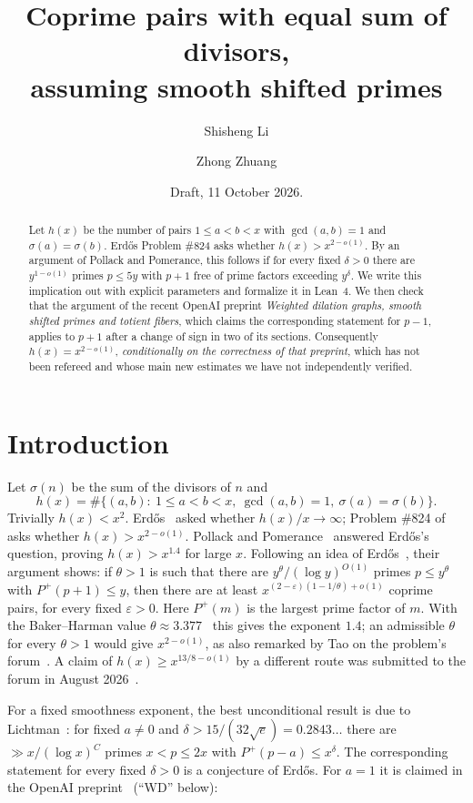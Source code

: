 \documentclass[11pt]{amsart}
\title[Coprime pairs with equal sum of divisors]{Coprime pairs with equal sum of divisors,\\ assuming smooth shifted primes}
\author{Shisheng Li}
\author{Zhong Zhuang}
\date{Draft, 11 October 2026.}
\theoremstyle{definition}
\theoremstyle{remark}
\newcommand{\eps}{\varepsilon}
\newcommand{\Pplus}{P^{+}}
\begin{document}
\sloppy
\begin{abstract}
Let $h(x)$ be the number of pairs $1\le a<b<x$ with $\gcd(a,b)=1$ and $\sigma(a)=\sigma(b)$. Erd\H{o}s Problem \#824 asks whether $h(x)>x^{2-o(1)}$. By an argument of Pollack and Pomerance, this follows if for every fixed $\delta>0$ there are $y^{1-o(1)}$ primes $p\le5y$ with $p+1$ free of prime factors exceeding $y^\delta$. We write this implication out with explicit parameters and formalize it in Lean~4. We then check that the argument of the recent OpenAI preprint \emph{Weighted dilation graphs, smooth shifted primes and totient fibers}, which claims the corresponding statement for $p-1$, applies to $p+1$ after a change of sign in two of its sections. Consequently $h(x)=x^{2-o(1)}$, \emph{conditionally on the correctness of that preprint}, which has not been refereed and whose main new estimates we have not independently verified.
\end{abstract}

\maketitle

\section{Introduction}

Let $\sigma(n)$ be the sum of the divisors of $n$ and
\[
 h(x)=\#\{(a,b):\ 1\le a<b<x,\ \gcd(a,b)=1,\ \sigma(a)=\sigma(b)\}.
\]
Trivially $h(x)<x^2$. Erd\H{o}s~\cite{Er59} asked whether $h(x)/x\to\infty$; Problem \#824 of~\cite{EP} asks whether $h(x)>x^{2-o(1)}$. Pollack and Pomerance~\cite[\S6]{PP16} answered Erd\H{o}s's question, proving $h(x)>x^{1.4}$ for large $x$. Following an idea of Erd\H{o}s~\cite{Er35}, their argument shows: if $\theta>1$ is such that there are $y^\theta/(\log y)^{O(1)}$ primes $p\le y^\theta$ with $\Pplus(p+1)\le y$, then there are at least $x^{(2-\eps)(1-1/\theta)+o(1)}$ coprime pairs, for every fixed $\eps>0$. Here $\Pplus(m)$ is the largest prime factor of $m$. With the Baker--Harman value $\theta\approx3.377$~\cite{BH98} this gives the exponent $1.4$; an admissible $\theta$ for every $\theta>1$ would give $x^{2-o(1)}$, as also remarked by Tao on the problem's forum~\cite{Tao}. A claim of $h(x)\ge x^{13/8-o(1)}$ by a different route was submitted to the forum in August 2026~\cite{Cam}.

For a fixed smoothness exponent, the best unconditional result is due to Lichtman~\cite{Li22}: for fixed $a\ne0$ and $\delta>15/(32\sqrt e)=0.2843\ldots$ there are $\gg x/(\log x)^C$ primes $x<p\le2x$ with $\Pplus(p-a)\le x^\delta$. The corresponding statement for every fixed $\delta>0$ is a conjecture of Erd\H{o}s. For $a=1$ it is claimed in the OpenAI preprint~\cite{WD} (``WD'' below):
\end{document}
